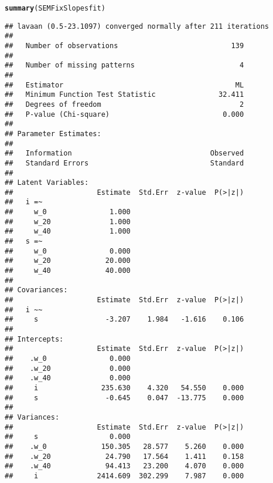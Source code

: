 \documentclass{article}\usepackage[]{graphicx}\usepackage[]{color}
\makeatletter
\newcommand{\hlstd}[1]{\textcolor[rgb]{0.345,0.345,0.345}{#1}}%
\newcommand{\hlkwd}[1]{\textcolor[rgb]{0.737,0.353,0.396}{\textbf{#1}}}%
\newenvironment{kframe}{%
 \def\at@end@of@kframe{}%
 \ifinner\ifhmode%
  \def\at@end@of@kframe{\end{minipage}}%
  \begin{minipage}{\columnwidth}%
 \fi\fi%
 \def\FrameCommand##1{\hskip\@totalleftmargin \hskip-\fboxsep
 \colorbox{shadecolor}{##1}\hskip-\fboxsep
     \hskip-\linewidth \hskip-\@totalleftmargin \hskip\columnwidth}%
 \MakeFramed {\advance\hsize-\width
   \@totalleftmargin\z@ \linewidth\hsize
   \@setminipage}}%
 {\par\unskip\endMakeFramed%
 \at@end@of@kframe}
\newenvironment{knitrout}{}{} %
\makeatother
\begin{document}
\begin{knitrout}
\begin{kframe}
{\ttfamily\noindent{}}\begin{alltt}
\hlkwd{summary}\hlstd{(SEMFixSlopesfit)}
\end{alltt}
\begin{verbatim}
## lavaan (0.5-23.1097) converged normally after 211 iterations
## 
##   Number of observations                           139
## 
##   Number of missing patterns                         4
## 
##   Estimator                                         ML
##   Minimum Function Test Statistic               32.411
##   Degrees of freedom                                 2
##   P-value (Chi-square)                           0.000
## 
## Parameter Estimates:
## 
##   Information                                 Observed
##   Standard Errors                             Standard
## 
## Latent Variables:
##                    Estimate  Std.Err  z-value  P(>|z|)
##   i =~                                                
##     w_0               1.000                           
##     w_20              1.000                           
##     w_40              1.000                           
##   s =~                                                
##     w_0               0.000                           
##     w_20             20.000                           
##     w_40             40.000                           
## 
## Covariances:
##                    Estimate  Std.Err  z-value  P(>|z|)
##   i ~~                                                
##     s                -3.207    1.984   -1.616    0.106
## 
## Intercepts:
##                    Estimate  Std.Err  z-value  P(>|z|)
##    .w_0               0.000                           
##    .w_20              0.000                           
##    .w_40              0.000                           
##     i               235.630    4.320   54.550    0.000
##     s                -0.645    0.047  -13.775    0.000
## 
## Variances:
##                    Estimate  Std.Err  z-value  P(>|z|)
##     s                 0.000                           
##    .w_0             150.305   28.577    5.260    0.000
##    .w_20             24.790   17.564    1.411    0.158
##    .w_40             94.413   23.200    4.070    0.000
##     i              2414.609  302.299    7.987    0.000

\end{verbatim}
\end{kframe}
\end{knitrout}
\end{document}
